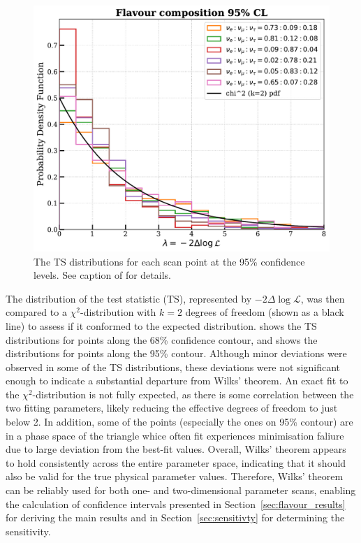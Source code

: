 \begin{figure}[h!]
    
    \includegraphics{./figures/results/wilkscheck_95CL.pdf}


    \caption[The TS distributions for each scan point at the 95\% confidence levels]{The TS distributions for each scan point at the 95\% confidence levels. See caption of  for details.}
\end{figure}

The distribution of the test statistic (TS), represented by \(-2 \Delta \log \mathcal{L}\), was then compared to a \(\chi^2\)-distribution with \(k=2\) degrees of freedom (shown as a black line) to assess if it conformed to the expected distribution.  shows the TS distributions for points along the 68\% confidence contour, and  shows the distributions for points along the 95\% contour. Although minor deviations were observed in some of the TS distributions, these deviations were not significant enough to indicate a substantial departure from Wilks' theorem. An exact fit to the \(\chi^2\)-distribution is not fully expected, as there is some correlation between the two fitting parameters, likely reducing the effective degrees of freedom to just below 2. In addition, some of the points (especially the ones on 95\% contour) are in a phase space of the triangle whice often fit experiences minimisation faliure due to large deviation from the best-fit values. Overall, Wilks' theorem appears to hold consistently across the entire parameter space, indicating that it should also be valid for the true physical parameter values. Therefore, Wilks' theorem can be reliably used for both one- and two-dimensional parameter scans, enabling the calculation of confidence intervals presented in Section~\ref{sec:flavour_results} for deriving the main results and in Section~\ref{sec:sensitivty} for determining the sensitivity.


